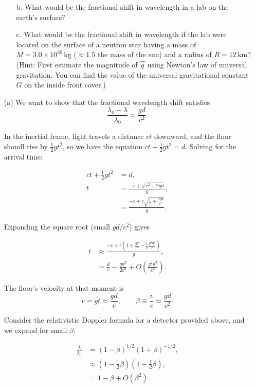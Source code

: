 \documentclass[12pt]{article}
\begin{document}
\begin{enumerate}
\begin{enumerate}
    \item[b.] What would be the fractional shift in wavelength in a lab on the earth’s surface?
    \item[c.] What would be the fractional shift in wavelength if the lab were located on the surface of a neutron star having a mass of $M = 3.0 \times 10^{30} \,\mathrm{kg}$ ($\approx 1.5$ the mass of the sun) and a radius of $R = 12 \,\mathrm{km}$? (Hint: First estimate the magnitude of $\vec g$ using Newton’s law of universal gravitation. You can find the value of the universal gravitational constant $G$ on the inside front cover.)
  \end{enumerate}
  \item[(a)]
  We want to show that the fractional wavelength shift satisfies
  \[
  \frac{\lambda_0 - \lambda}{\lambda_0} \approx \frac{g d}{c^2}.
  \]
  
  In the inertial frame, light travels a distance $ct$ downward, and the floor shoudl rise by $\tfrac12 g t^2$, so we have the equation $ct + \tfrac12 g t^2 = d$. Solving for the arrival time:
  
  \[
  \begin{aligned}
  ct + \tfrac12 g t^2 &= d,\\
  t &= \frac{-c + \sqrt{c^2 + 2 g d}}{g},\\
  &= \frac{-c + c\sqrt{1 + \tfrac{2gd}{c^2}}}{g}.
  \end{aligned}
  \]
  
  Expanding the square root (small $gd/c^2$) gives
  
  \[
  \begin{aligned}
  t &\approx \frac{-c + c\left(1 + \frac{gd}{c^2} - \tfrac12 \frac{g^2 d^2}{c^4}\right)}{g},\\
  &= \frac{d}{c} - \frac{g d^2}{2 c^3} + O\!\left(\frac{g^2 d^3}{c^5}\right).
  \end{aligned}
  \]
  
  The floor’s velocity at that moment is
  \[
  v = g t \approx \frac{g d}{c}, 
  \qquad \beta \equiv \frac{v}{c} \approx \frac{g d}{c^2}.
  \]
  
  Consider the relativistic Doppler formula for a detector provided above, and we expand for small $\beta$:
  
  \[
  \begin{aligned}
  \frac{\lambda}{\lambda_0} 
  &= (1 - \beta)^{1/2}(1 + \beta)^{-1/2},\\
  &\approx \left(1 - \tfrac12\beta\right)\!\left(1 - \tfrac12\beta\right),\\
  &= 1 - \beta + O(\beta^2).
  \end{aligned}
  \]
  

\end{enumerate}
\end{document}
